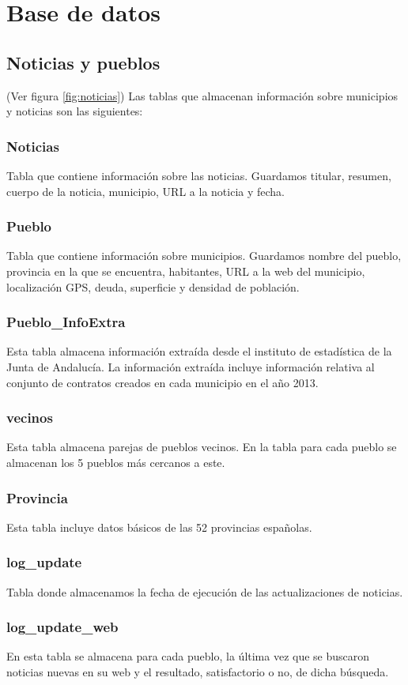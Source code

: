 \chapter{Base de datos}
\label{anexo:bd}
\section{Noticias y pueblos}
(Ver figura \ref{fig:noticias}) Las tablas que almacenan información sobre municipios y noticias son las siguientes:
\subsection{Noticias}
Tabla que contiene información sobre las noticias. Guardamos titular, resumen, cuerpo de la noticia, municipio, URL a la noticia y  fecha.
\subsection{Pueblo}
Tabla que contiene información sobre municipios. Guardamos nombre del pueblo, provincia en la que se encuentra, habitantes, URL a la web del municipio, localización GPS, deuda, superficie y densidad de población.
\subsection{Pueblo\_InfoExtra}
Esta tabla almacena información extraída desde el instituto de estadística de la Junta de Andalucía. La información extraída incluye información relativa al conjunto de contratos creados en cada municipio en el año 2013.
\subsection{vecinos}
Esta tabla almacena parejas de pueblos vecinos. En la tabla para cada pueblo se almacenan los 5 pueblos más cercanos a este.
\subsection{Provincia}
Esta tabla incluye datos básicos de las 52 provincias españolas.
\subsection{log\_update}
Tabla donde almacenamos la fecha de ejecución de las actualizaciones de noticias.
\subsection{log\_update\_web}
En esta tabla se almacena para cada pueblo, la última vez que se buscaron noticias nuevas en su web y el resultado, satisfactorio o no, de dicha búsqueda.

